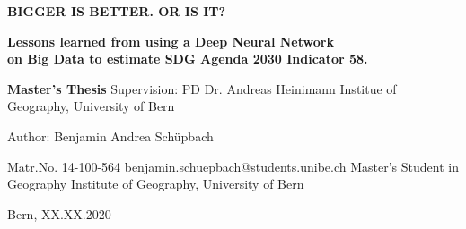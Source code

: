 
	

\clearpage
\thispagestyle{empty}
\setlength{\hoffset}{-20mm}




\begin{tcolorbox}[standard jigsaw, colback=black, opacityback=1, width=620, opacityframe=0, coltext=white]
	

	{\Huge \textbf{BIGGER IS BETTER. OR IS IT?}}\bigbreak



		\textbf{{\Large Lessons learned from using a Deep Neural Network\\ on Big Data to estimate SDG Agenda 2030 Indicator 58.}}



\end{tcolorbox}


\vspace{4cm}

\begin{tcolorbox}[standard jigsaw, colback=black, opacityback=0, width=280, opacityframe=0, coltext=white]
{	
	\smallbreak
	
	\large 
	\textbf{Master's Thesis}
	\smallbreak
	Supervision: \bigbreak
	PD Dr. Andreas Heinimann\bigbreak
	Institue of Geography, University of Bern\bigbreak\bigbreak
	
	
	Author:\bigbreak	
	Benjamin Andrea Schüpbach \bigbreak
	
	Matr.No. 14-100-564\smallbreak
	benjamin.schuepbach@students.unibe.ch\smallbreak
	Master's Student in Geography\smallbreak
	Institute of Geography, University of Bern\bigbreak
	

	Bern, XX.XX.2020


}
\end{tcolorbox}


\clearpage
\setlength{\hoffset}{0mm}





\newpage